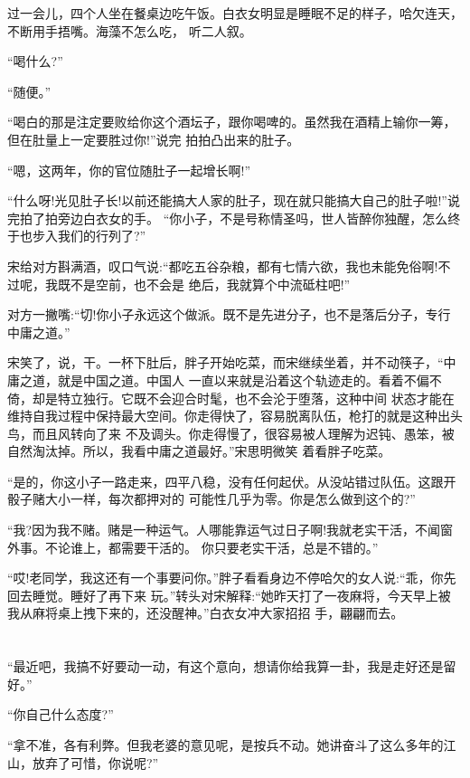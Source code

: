 \documentclass[11pt,a4paper,onecolumn]{article}
\begin{document}
过一会儿，四个人坐在餐桌边吃午饭。白衣女明显是睡眠不足的样子，哈欠连天，不断用手捂嘴。海藻不怎么吃，
听二人叙。

``喝什么?''

``随便。''

``喝白的那是注定要败给你这个酒坛子，跟你喝啤的。虽然我在酒精上输你一筹，但在肚量上一定要胜过你!''说完
拍拍凸出来的肚子。

``嗯，这两年，你的官位随肚子一起增长啊!''

``什么呀!光见肚子长!以前还能搞大人家的肚子，现在就只能搞大自己的肚子啦!''说完拍了拍旁边白衣女的手。
``你小子，不是号称情圣吗，世人皆醉你独醒，怎么终于也步入我们的行列了?''

宋给对方斟满酒，叹口气说:``都吃五谷杂粮，都有七情六欲，我也未能免俗啊!不过呢，我既不是空前，也不会是
绝后，我就算个中流砥柱吧!''

对方一撇嘴:``切!你小子永远这个做派。既不是先进分子，也不是落后分子，专行中庸之道。''

宋笑了，说，干。一杯下肚后，胖子开始吃菜，而宋继续坐着，并不动筷子，``中庸之道，就是中国之道。中国人
一直以来就是沿着这个轨迹走的。看着不偏不倚，却是特立独行。它既不会迎合时髦，也不会沦于堕落，这种中间
状态才能在维持自我过程中保持最大空间。你走得快了，容易脱离队伍，枪打的就是这种出头鸟，而且风转向了来
不及调头。你走得慢了，很容易被人理解为迟钝、愚笨，被自然淘汰掉。所以，我看中庸之道最好。''宋思明微笑
着看胖子吃菜。

``是的，你这小子一路走来，四平八稳，没有任何起伏。从没站错过队伍。这跟开骰子赌大小一样，每次都押对的
可能性几乎为零。你是怎么做到这个的?''

``我?因为我不赌。赌是一种运气。人哪能靠运气过日子啊!我就老实干活，不闻窗外事。不论谁上，都需要干活的。
你只要老实干活，总是不错的。''

``哎!老同学，我这还有一个事要问你。''胖子看看身边不停哈欠的女人说:``乖，你先回去睡觉。睡好了再下来
玩。''转头对宋解释:``她昨天打了一夜麻将，今天早上被我从麻将桌上拽下来的，还没醒神。''白衣女冲大家招招
手，翩翩而去。

\section[\thesection]{}

``最近吧，我搞不好要动一动，有这个意向，想请你给我算一卦，我是走好还是留好。''

``你自己什么态度?''

``拿不准，各有利弊。但我老婆的意见呢，是按兵不动。她讲奋斗了这么多年的江山，放弃了可惜，你说呢?''
\end{document}
